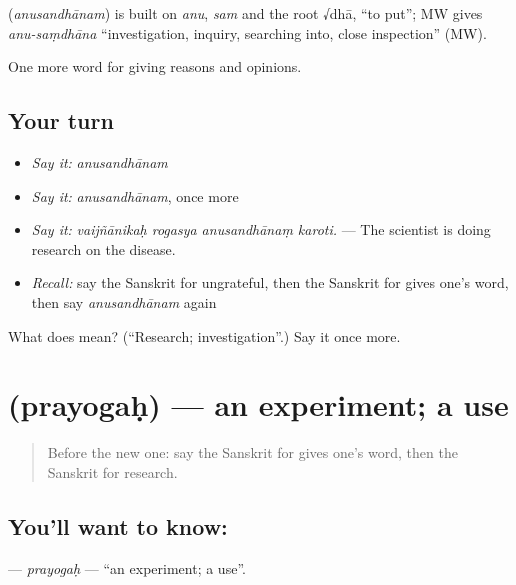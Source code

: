 \begin{cousinweb}
\textbf{} (\emph{anusandhānam}) is built on \emph{anu}, \emph{sam} and the root √dhā, \textquotedblleft{}to put\textquotedblright{}; MW gives \emph{anu-saṃdhāna} \textquotedblleft{}investigation, inquiry, searching into, close inspection\textquotedblright{} (MW).
\end{cousinweb}

\begin{grammarlens}[title={What you've built}]
One more word for giving reasons and opinions.
\end{grammarlens}

\subsection*{Your turn}
\begin{itemize}
\raggedright
  \item \emph{Say it:} \emph{anusandhānam}
  \item \emph{Say it:} \emph{anusandhānam}, once more
  \item \emph{Say it:} \emph{vaijñānikaḥ rogasya anusandhānaṃ karoti.} — The scientist is doing research on the disease.
  \item \emph{Recall:} say the Sanskrit for ungrateful, then the Sanskrit for gives one's word, then say \emph{anusandhānam} again
\end{itemize}

\begin{tcolorbox}[breakable,colback=teal!4,colframe=teal!35!black,title={Before you move on}]
What does  mean? (\textquotedblleft{}Research; investigation\textquotedblright{}.) Say it once more.
\end{tcolorbox}
\section[\texorpdfstring{\sk{प्रयोगः} (prayogaḥ)}{प्रयोगः (prayogaḥ)}]{ (prayogaḥ) — an experiment; a use}

\label{lesson:SA-C362-prayogah}



\begin{quote}
Before the new one: say the Sanskrit for gives one's word, then the Sanskrit for research.
\end{quote}

\subsection*{You'll want to know: }
\textbf{} — \emph{prayogaḥ} — \textquotedblleft{}an experiment; a use\textquotedblright{}.

